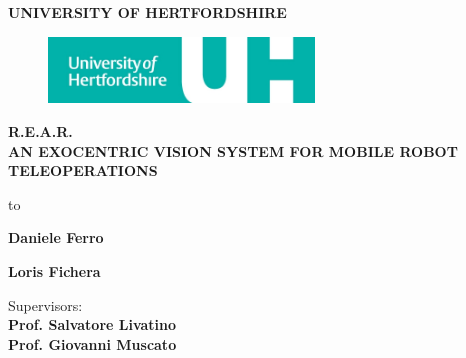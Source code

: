 \begin{titlepage}
  \begin{center}
    \textbf{\uppercase{University of HertfordShire}}\\
    
    
    \begin{figure}[!h]
      \begin{center}
        \includegraphics[width=200pt]{img/uni_logo}  %
      \end{center}
    \end{figure}
              
    \uppercase{ \textbf{
        \LARGE{R.E.A.R.} \\ 
        \vspace{0.5truecm}
        \large{an exocentric vision system for 
          mobile robot teleoperations}
      }}
              
    \vspace{7truecm}
    
    \hbox to \textwidth{\hrulefill}
    
    \vspace{1truecm}
    
    \begin{flushright}
      \textbf{Daniele Ferro} \\                
      \vspace{0.5truecm}
      
      \textbf{Loris Fichera} \\
      \vspace{1truecm}
                
      Supervisors:\\
      \textbf{Prof. Salvatore Livatino }\\
      \textbf{Prof. Giovanni Muscato}
                
    \end{flushright}
    
    \vspace{1truecm}
    
  \end{center}
  
\end{titlepage}

\setlength{\baselineskip}{1.3\baselineskip} %

\tableofcontents

\newpage
